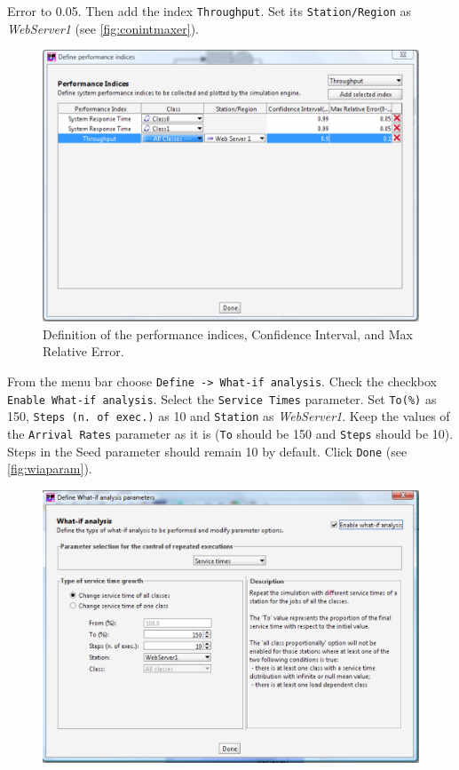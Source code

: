\begin{itemize*}
{Error} to 0.05. Then add the index \texttt{Throughput}. Set its
\texttt{Station/Region} as \emph{WebServer1} (see
\autoref{fig:conintmaxer}).
\begin{figure}[htb]
    \begin{center}
        \includegraphics[scale=.5]{img/jsimg/12.23.eps}
    \end{center}
    \caption{Definition of the performance indices,
    Confidence Interval, and Max Relative Error.}
    \label{fig:conintmaxer}
\end{figure}
\item From the menu bar choose \texttt{Define -> What-if
analysis}. Check the checkbox \texttt{Enable What-if analysis}.
Select the \texttt{Service Times} parameter. Set \texttt{To(\%)}
as 150, \texttt{Steps (n. of exec.)} as 10 and \texttt{Station} as
\emph{WebServer1}. Keep the values of the \texttt{Arrival Rates}
parameter as it is (\texttt{To} should be 150 and \texttt{Steps}
should be 10). Steps in the Seed parameter should remain 10 by
default. Click \texttt{Done} (see \autoref{fig:wiaparam}).
\begin{figure}[htb]
    \begin{center}
        \includegraphics[scale=.5]{img/jsimg/12.24.eps}

\end{center}
\end{figure}
\end{itemize*}
